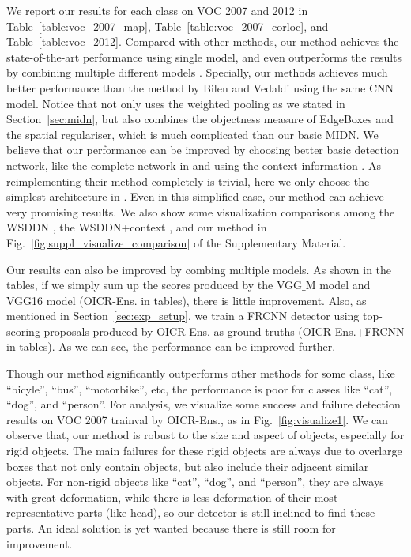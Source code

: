 \documentclass[10pt,twocolumn,letterpaper]{article}
\def\methodname{OICR}
\begin{document}
We report our results for each class on VOC 2007 and 2012 in Table~\ref{table:voc_2007_map}, Table~\ref{table:voc_2007_corloc}, and Table~\ref{table:voc_2012}.
Compared with other methods, our method achieves the state-of-the-art performance using single model, and even outperforms the results by combining multiple different models \cite{Ref:Bilen2016,Ref:Li2016}.
Specially, our methods achieves much better performance than the method by Bilen and Vedaldi \cite{Ref:Bilen2016} using the same CNN model.
Notice that \cite{Ref:Bilen2016} not only uses the weighted pooling as we stated in Section~\ref{sec:midn}, but also combines the objectness measure of EdgeBoxes \cite{Ref:Zitnick2014} and the spatial regulariser, which is much complicated than our basic MIDN.
We believe that our performance can be improved by choosing better basic detection network, like the complete network in \cite{Ref:Bilen2016} and using the context information \cite{Ref:Kantorov2016}.
As reimplementing their method completely is trivial, here we only choose the simplest architecture in \cite{Ref:Bilen2016}.
Even in this simplified case, our method can achieve very promising results.
We also show some visualization comparisons among the WSDDN \cite{Ref:Bilen2016}, the WSDDN+context \cite{Ref:Kantorov2016}, and our method in Fig.~\ref{fig:suppl_visualize_comparison} of the Supplementary Material.

Our results can also be improved by combing multiple models.
As shown in the tables, if we simply sum up the scores produced by the VGG$\_$M model and VGG16 model (\methodname-Ens. in tables), there is little improvement.
Also, as mentioned in Section~\ref{sec:exp_setup}, we train a FRCNN detector using top-scoring proposals produced by \methodname-Ens. as ground truths (\methodname-Ens.+FRCNN in tables).
As we can see, the performance can be improved further.

Though our method significantly outperforms other methods for some class, like ``bicyle'', ``bus'', ``motorbike'', etc, the performance is poor for classes like ``cat'', ``dog'', and ``person''.
For analysis, we visualize some success and failure detection results on VOC 2007 trainval by \methodname-Ens., as in Fig.~\ref{fig:visualize1}.
We can observe that, our method is robust to the size and aspect of objects, especially for rigid objects.
The main failures for these rigid objects are always due to overlarge boxes that not only contain objects, but also include their adjacent similar objects.
For non-rigid objects like ``cat'', ``dog'', and ``person'', they are always with great deformation, while there is less deformation of their most representative parts (like head), so our detector is still inclined to find these parts.
An ideal solution is yet wanted because there is still room for improvement.
\end{document}
